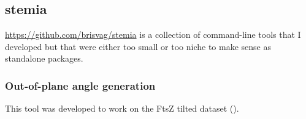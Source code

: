 \subsection{stemia}

\href{Stemia}{https://github.com/brisvag/stemia} is a collection of command-line tools that I developed but that were either too small or too niche to make sense as standalone packages.

\subsubsection{Out-of-plane angle generation}\label{stemia_angles}
This tool was developed to work on the FtsZ tilted dataset (). %

